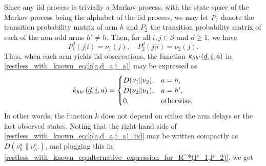 Since any iid process is trivially a Markov process, with the state space of the Markov process being the alphabet of the iid process, we may let $P_1$ denote the transition probability matrix of arm $h$ and $P_2$ the transition probability matrix of each of the non-odd arms $h'\neq h$. Then, for all $i,j\in\mathcal{S}$ and $d\geq 1$, we have
\begin{equation}
	P_1^d(j|i)=\nu_1(j),\quad P_2^d(j|i)=\nu_2(j).\label{restless_with_known_eq:correspondence_btw_P_and_nu}
\end{equation}
Thus, when each arm yields iid observations, the function $\textcolor{black}{k_{hh'}(\underline{d}, \underline{i}, a)}$ in \eqref{restless_with_known_eq:k(a,d_a,i_a)} may be expressed as
\begin{equation}
	\textcolor{black}{k_{hh'}(\underline{d}, \underline{i}, a)}=
	\begin{cases}
		D(\nu_1\|\nu_2),&a=h,\\
		{D(\nu_2\|\nu_1)},&a=h',\\
		0, &\text{otherwise}.
	\end{cases}\label{restless_with_known_eq:k(a,d_a,i_a)_iid}
\end{equation}
In other words, the function $k$ does not depend on either the arm delays or the last observed states. Noting that the right-hand side of \eqref{restless_with_known_eq:k(a,d_a,i_a)_iid} may be written compactly as $D(\nu_h^a\|\nu_{h'}^a)$, and plugging this in \eqref{restless_with_known_eq:alternative_expression_for_R^*(P_1,P_2)}, we get
\begingroup \allowdisplaybreaks

